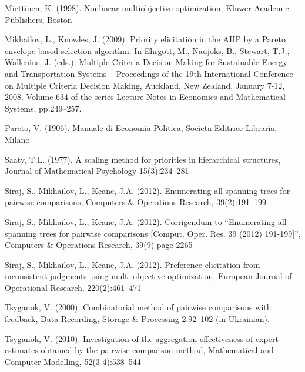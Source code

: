 \documentclass{article}
\theoremstyle{plain}
\begin{document}
\begin{thebibliography}{99}
Miettinen, K. (1998). Nonlinear multiobjective optimization,
Kluwer Academic Publishers, Boston


Mikhailov, L., Knowles, J. (2009).
Priority elicitation in the AHP by a Pareto envelope-based selection algorithm.
In Ehrgott, M., Naujoks, B., Stewart, T.J., Wallenius, J. (eds.):
Multiple Criteria Decision Making for Sustainable Energy and Transportation Systems
-- Proceedings of the 19th International Conference on Multiple Criteria Decision Making,
Auckland, New Zealand, January 7-12, 2008.
Volume 634 of the series Lecture Notes in Economics and Mathematical Systems,
pp.249--257.


Pareto, V. (1906). Manuale di Economia Politica,
Societa Editrice Libraria, Milano

Saaty, T.L. (1977).
A scaling method for priorities in hierarchical structures,
Journal of Mathematical Psychology
15(3):234--281.

Siraj, S., Mikhailov, L., Keane, J.A. (2012).
Enumerating all spanning trees for pairwise comparisons,
Computers \& Operations Research,
39(2):191--199

Siraj, S., Mikhailov, L., Keane, J.A. (2012).
Corrigendum to ``Enumerating all spanning trees for pairwise comparisons [Comput. Oper. Res. 39 (2012) 191-199]'',
Computers \& Operations Research,
39(9) page 2265

Siraj, S., Mikhailov, L., Keane, J.A. (2012).
Preference elicitation from inconsistent judgments using multi-objective optimization,
European Journal of Operational Research,
220(2):461--471

Tsyganok, V. (2000).
Combinatorial method of pairwise comparisons with feedback,
Data Recording, Storage \& Processing
2:92--102 (in Ukrainian).


Tsyganok, V. (2010).
Investigation of the aggregation ef{\kern0pt}fectiveness of expert estimates obtained by the pairwise comparison method,
Mathematical and Computer Modelling,
52(3-4):538--544


\end{thebibliography}
\end{document}
